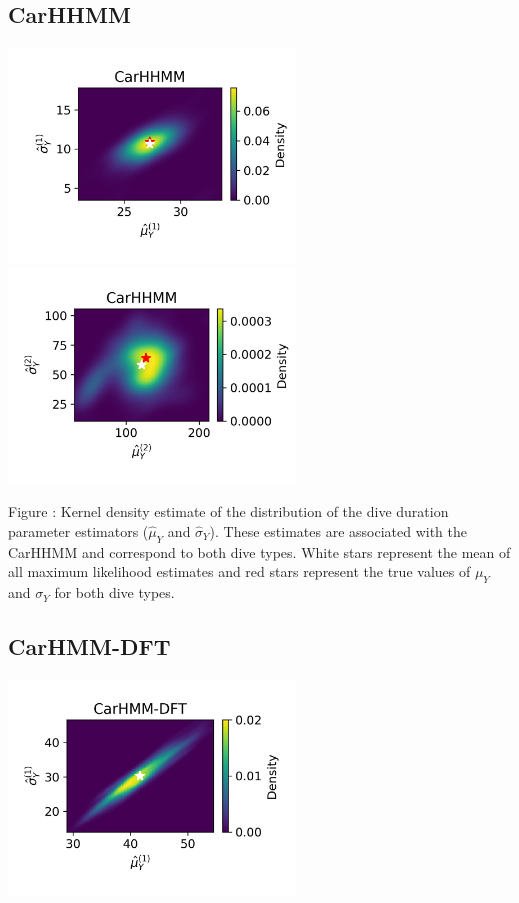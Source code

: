 \documentclass{article}
\begin{document}
        \subsection{CarHHMM}
        \begin{center}
        \includegraphics[width=3in]{../Plots/hhmm_V_MLE_density_dive_duration_-1_0.png}
        \includegraphics[width=3in]{../Plots/hhmm_V_MLE_density_dive_duration_-1_1.png}
        \end{center}
        
        \noindent Figure : Kernel density estimate of the distribution of the dive duration parameter estimators ($\hat \mu_Y$ and $\hat \sigma_Y$). These estimates are associated with the CarHHMM and correspond to both dive types. White stars represent the mean of all maximum likelihood estimates and red stars represent the true values of $\mu_Y$ and $\sigma_Y$ for both dive types.
        \addtocounter{fignum}{1}
        
        \subsection{CarHMM-DFT}
        \begin{center}
        \includegraphics[width=3in]{../Plots/hmm_FV_MLE_density_dive_duration_-1_0.png}
        \end{center}
        
\end{document}
